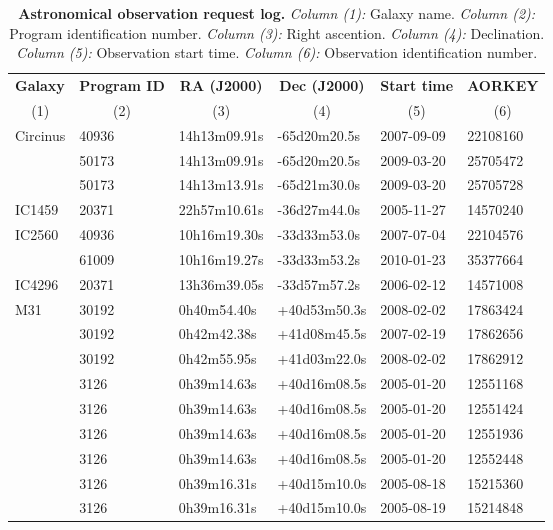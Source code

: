 \begin{table*}
\begin{center}
\caption{{\bf Astronomical observation request log.}
\emph{Column (1):} Galaxy name.
\emph{Column (2):} Program identification number.
\emph{Column (3):} Right ascention.
\emph{Column (4):} Declination.
\emph{Column (5):} Observation start time.
\emph{Column (6):} Observation identification number. } 
\begin{tabular}{llllll}
\hline 
\multicolumn{1}{l}{{\bf Galaxy}} & 
\multicolumn{1}{c}{{\bf Program ID}} & 
\multicolumn{1}{c}{{\bf RA (J2000)}} & 
\multicolumn{1}{c}{{\bf Dec (J2000)}} & 
\multicolumn{1}{c}{{\bf Start time}} & 
\multicolumn{1}{c}{{\bf AORKEY}} \\
\multicolumn{1}{c}{(1)} & 
\multicolumn{1}{c}{(2)} & 
\multicolumn{1}{c}{(3)} & 
\multicolumn{1}{c}{(4)} & 
\multicolumn{1}{c}{(5)} & 
\multicolumn{1}{c}{(6)} \\ 
\hline
  Circinus & 40936 & 14h13m09.91s & -65d20m20.5s & 2007-09-09 & 22108160\\
   & 50173 & 14h13m09.91s & -65d20m20.5s & 2009-03-20 & 25705472\\
   & 50173 & 14h13m13.91s & -65d21m30.0s & 2009-03-20 & 25705728\\
  IC1459 & 20371 & 22h57m10.61s & -36d27m44.0s & 2005-11-27 & 14570240\\
  IC2560 & 40936 & 10h16m19.30s & -33d33m53.0s & 2007-07-04 & 22104576\\
   & 61009 & 10h16m19.27s & -33d33m53.2s & 2010-01-23 & 35377664\\
  IC4296 & 20371 & 13h36m39.05s & -33d57m57.2s & 2006-02-12 & 14571008\\
  M31 & 30192 & 0h40m54.40s & +40d53m50.3s & 2008-02-02 & 17863424\\
   & 30192 & 0h42m42.38s & +41d08m45.5s & 2007-02-19 & 17862656\\
   & 30192 & 0h42m55.95s & +41d03m22.0s & 2008-02-02 & 17862912\\
   & 3126 & 0h39m14.63s & +40d16m08.5s & 2005-01-20 & 12551168\\
   & 3126 & 0h39m14.63s & +40d16m08.5s & 2005-01-20 & 12551424\\
   & 3126 & 0h39m14.63s & +40d16m08.5s & 2005-01-20 & 12551936\\
   & 3126 & 0h39m14.63s & +40d16m08.5s & 2005-01-20 & 12552448\\
   & 3126 & 0h39m16.31s & +40d15m10.0s & 2005-08-18 & 15215360\\
   & 3126 & 0h39m16.31s & +40d15m10.0s & 2005-08-19 & 15214848\\

\end{tabular}
\end{center}
\end{table*}

